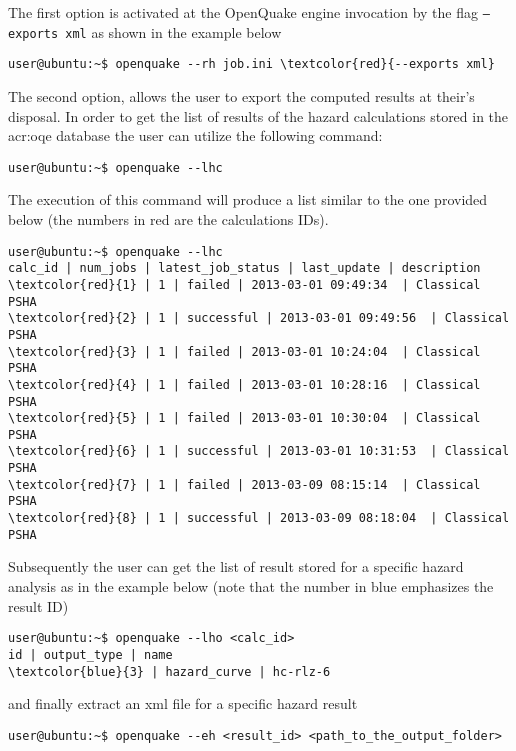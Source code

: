 The first option is activated at the OpenQuake engine invocation by 
the flag \texttt{--exports xml} as shown in the example below
\begin{Verbatim}[frame=single, commandchars=\\\{\}, fontsize=\small]
user@ubuntu:~$ openquake --rh job.ini \textcolor{red}{--exports xml}
\end{Verbatim}

The second option, allows the user to export the computed results at 
their's disposal.
In order to get the list of results of the hazard calculations stored 
in the \gls{acr:oqe} database the user can utilize the following command:
\begin{Verbatim}[frame=single, commandchars=\\\{\}, fontsize=\small]
user@ubuntu:~$ openquake --lhc
\end{Verbatim}
The execution of this command will produce a list similar to the 
one provided below (the numbers in red are the calculations IDs).
\begin{Verbatim}[frame=single, commandchars=\\\{\}, fontsize=\small]
user@ubuntu:~$ openquake --lhc
calc_id | num_jobs | latest_job_status | last_update | description
\textcolor{red}{1} | 1 | failed | 2013-03-01 09:49:34  | Classical PSHA
\textcolor{red}{2} | 1 | successful | 2013-03-01 09:49:56  | Classical PSHA
\textcolor{red}{3} | 1 | failed | 2013-03-01 10:24:04  | Classical PSHA
\textcolor{red}{4} | 1 | failed | 2013-03-01 10:28:16  | Classical PSHA
\textcolor{red}{5} | 1 | failed | 2013-03-01 10:30:04  | Classical PSHA
\textcolor{red}{6} | 1 | successful | 2013-03-01 10:31:53  | Classical PSHA
\textcolor{red}{7} | 1 | failed | 2013-03-09 08:15:14  | Classical PSHA
\textcolor{red}{8} | 1 | successful | 2013-03-09 08:18:04  | Classical PSHA
\end{Verbatim}
Subsequently the user can get the list of result stored for a specific 
hazard analysis as in the example below (note that the number in blue 
emphasizes the result ID)
\begin{Verbatim}[frame=single, commandchars=\\\{\}, fontsize=\small]
user@ubuntu:~$ openquake --lho <calc_id>
id | output_type | name
\textcolor{blue}{3} | hazard_curve | hc-rlz-6
\end{Verbatim}
and finally extract an xml file for a specific hazard result 
\begin{Verbatim}[frame=single, commandchars=\\\{\}, fontsize=\small]
user@ubuntu:~$ openquake --eh <result_id> <path_to_the_output_folder>
\end{Verbatim}




